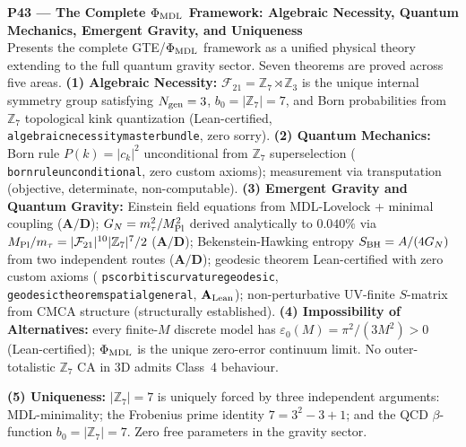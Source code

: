 \documentclass[11pt]{article}
\newcommand{\lean}[1]{%
  \penalty-100
  \begingroup\def\_{{\textunderscore\allowbreak}}\texttt{#1}\endgroup}
\begin{document}
\medskip
\noindent\textbf{P43 — The Complete $\Phi_{\rm MDL}$ Framework: Algebraic Necessity,
Quantum Mechanics, Emergent Gravity, and Uniqueness}~\cite{SpivackCompleteness}\\
Presents the complete GTE/$\Phi_{\rm MDL}$ framework as a unified physical theory
extending to the full quantum gravity sector.  Seven theorems are proved across five
areas.
\textbf{(1) Algebraic Necessity:} $\mathcal{F}_{21} = \mathbb{Z}_7\rtimes\mathbb{Z}_3$
is the unique internal symmetry group satisfying $N_{\rm gen}=3$, $b_0 = |\mathbb{Z}_7| = 7$,
and Born probabilities from $\mathbb{Z}_7$ topological kink quantization (Lean-certified,
\lean{algebraic\_necessity\_master\_bundle}, zero sorry).
\textbf{(2) Quantum Mechanics:} Born rule $P(k)=|c_k|^2$ unconditional from
$\mathbb{Z}_7$ superselection (\lean{born\_rule\_unconditional}, zero custom axioms);
measurement via transputation (objective, determinate, non-computable).
\textbf{(3) Emergent Gravity and Quantum Gravity:} Einstein field equations from
MDL-Lovelock + minimal coupling ($\mathbf{A/D}$); $G_N = m_\tau^2/M_{\rm Pl}^2$ derived analytically
to $0.040\%$ via $M_{\rm Pl}/m_\tau = |\mathcal{F}_{21}|^{10}|\mathbb{Z}_7|^7/2$ ($\mathbf{A/D}$);
Bekenstein-Hawking entropy $S_{\rm BH} = A/(4G_N)$ from two independent routes ($\mathbf{A/D}$);
geodesic theorem Lean-certified with zero custom axioms
(\lean{psc\_orbit\_is\_curvature\_geodesic}, \lean{geodesic\_theorem\_spatial\_general},
$\mathbf{A}_{\rm Lean}$);
non-perturbative UV-finite $S$-matrix from CMCA structure (structurally established).
\textbf{(4) Impossibility of Alternatives:} every finite-$M$ discrete model has
$\varepsilon_0(M) = \pi^2/(3M^2) > 0$ (Lean-certified); $\Phi_{\rm MDL}$ is the
unique zero-error continuum limit.  No outer-totalistic $\mathbb{Z}_7$ CA in 3D admits
Class~4 behaviour.
\begin{sloppypar}\noindent\textbf{(5) Uniqueness:} $|\mathbb{Z}_7|=7$ is uniquely forced by three independent
arguments: MDL-minimality; the Frobenius prime identity $7 = 3^2 - 3 + 1$;
and the QCD $\beta$-function $b_0 = |\mathbb{Z}_7|=7$.
Zero free parameters in the gravity sector.\end{sloppypar}
\end{document}
